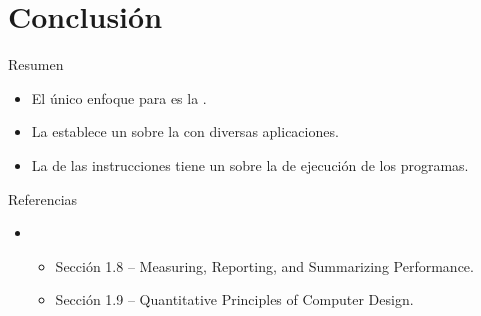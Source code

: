 \section{Conclusión}

\begin{frame}[t]{Resumen}
\begin{itemize}
  \item El único enfoque  para 
        es la .

  \item La  establece un  
        sobre la 
        con diversas aplicaciones.

  \item La  de las instrucciones tiene un  
        sobre la  de ejecución de los programas.
\end{itemize}
\end{frame}

\begin{frame}[t]{Referencias}
\begin{itemize}
  \item \credithennessy
    \begin{itemize}
      \item Sección 1.8 -- Measuring, Reporting, and Summarizing Performance.
      \item Sección 1.9 -- Quantitative Principles of Computer Design.
    \end{itemize}
\end{itemize}
\end{frame}
